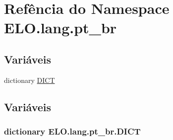 \hypertarget{namespaceELO_1_1lang_1_1pt__br}{\section{Refência do Namespace E\-L\-O.\-lang.\-pt\-\_\-br}
\label{namespaceELO_1_1lang_1_1pt__br}
}
\subsection*{Variáveis}
\begin{DoxyCompactItemize}
\item 
dictionary \hyperlink{namespaceELO_1_1lang_1_1pt__br_a37d91f508a335ecdb0e0ecc519a1f1a5}{D\-I\-C\-T}
\end{DoxyCompactItemize}


\subsection{Variáveis}
\hypertarget{namespaceELO_1_1lang_1_1pt__br_a37d91f508a335ecdb0e0ecc519a1f1a5}{
\subsubsection[{D\-I\-C\-T}]{\setlength{\rightskip}{0pt plus 5cm}dictionary E\-L\-O.\-lang.\-pt\-\_\-br.\-D\-I\-C\-T}}\label{namespaceELO_1_1lang_1_1pt__br_a37d91f508a335ecdb0e0ecc519a1f1a5}
